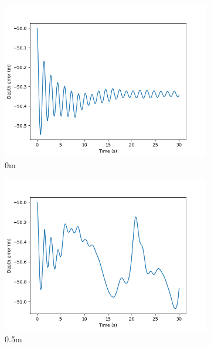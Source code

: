 \documentclass[class=article, crop=false]{standalone}
\begin{document}
\begin{figure}
    \centering
    \begin{subfigure}[b]{0.48\textwidth}
        \centering
        \includegraphics{scenario1/rov-50m/0.0m/rov_depth_error_controlled}
        \caption{0m}
        \label{}
    \end{subfigure}
    \hfill
    \begin{subfigure}[b]{0.48\textwidth}
        \centering
        \includegraphics{scenario1/rov-50m/0.5m/rov_depth_error_controlled}
        \caption{0.5m}
        \label{}
    \end{subfigure}
    \vfill
    \begin{subfigure}[b]{0.48\textwidth}
        \centering

\end{subfigure}
\end{figure}
\end{document}
